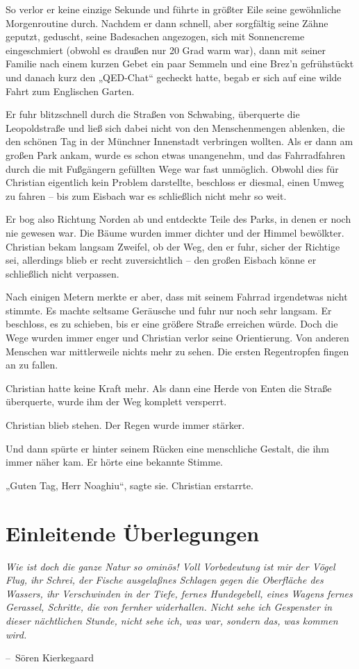 \documentclass[oneside]{memoir}
\makeatletter
\newenvironment{chapquote}[2][2em]
  {\setlength{\@tempdima}{#1}%
   \def\chapquote@author{#2}%
   \parshape 1 \@tempdima \dimexpr\textwidth-2\@tempdima\relax%
   \itshape}
  {\par\normalfont\hfill--\ \chapquote@author\hspace*{\@tempdima}\par\bigskip}
\makeatother
\begin{document}
So verlor er keine einzige Sekunde und führte in größter Eile seine gewöhnliche Morgenroutine durch. Nachdem er dann schnell, aber sorgfältig seine Zähne geputzt, geduscht, seine Badesachen angezogen, sich mit Sonnencreme eingeschmiert (obwohl es draußen nur 20 Grad warm war), dann mit seiner Familie nach einem kurzen Gebet ein paar Semmeln und eine Brez'n gefrühstückt und danach kurz den „QED-Chat“ gecheckt hatte, begab er sich auf eine wilde Fahrt zum Englischen Garten.

Er fuhr blitzschnell durch die Straßen von Schwabing, überquerte die Leopoldstraße und ließ sich dabei nicht von den Menschenmengen ablenken, die den schönen Tag in der Münchner Innenstadt verbringen wollten. Als er dann am großen Park ankam, wurde es schon etwas unangenehm, und das Fahrradfahren durch die mit Fußgängern gefüllten Wege war fast unmöglich. Obwohl dies für Christian eigentlich kein Problem darstellte, beschloss er diesmal, einen Umweg zu fahren -- bis zum Eisbach war es schließlich nicht mehr so weit.

Er bog also Richtung Norden ab und entdeckte Teile des Parks, in denen er noch nie gewesen war. Die Bäume wurden immer dichter und der Himmel bewölkter. Christian bekam langsam Zweifel, ob der Weg, den er fuhr, sicher der Richtige sei, allerdings blieb er recht zuversichtlich -- den großen Eisbach könne er schließlich nicht verpassen.

Nach einigen Metern merkte er aber, dass mit seinem Fahrrad irgendetwas nicht stimmte. Es machte seltsame Geräusche und fuhr nur noch sehr langsam. Er beschloss, es zu schieben, bis er eine größere Straße erreichen würde. Doch die Wege wurden immer enger und Christian verlor seine Orientierung. Von anderen Menschen war mittlerweile nichts mehr zu sehen. Die ersten Regentropfen fingen an zu fallen.

Christian hatte keine Kraft mehr. Als dann eine Herde von Enten die Straße überquerte, wurde ihm der Weg komplett versperrt.

Christian blieb stehen. Der Regen wurde immer stärker.

Und dann spürte er hinter seinem Rücken eine menschliche Gestalt, die ihm immer näher kam.
Er hörte eine bekannte Stimme.

„Guten Tag, Herr Noaghiu“, sagte sie.
Christian erstarrte.
 

\chapter{Einleitende Überlegungen} %
\begin{chapquote}{Sören Kierkegaard}
\glqq Wie ist doch die ganze Natur so ominös! Voll Vorbedeutung ist mir der Vögel Flug, ihr Schrei, der Fische ausgelaßnes Schlagen gegen die Oberfläche des Wassers, ihr Verschwinden in der Tiefe, fernes Hundegebell, eines Wagens fernes Gerassel, Schritte, die von fernher widerhallen. Nicht sehe ich Gespenster in dieser nächtlichen Stunde, nicht sehe ich, was war, sondern das, was kommen wird.\grqq
\end{chapquote}
\end{document}
